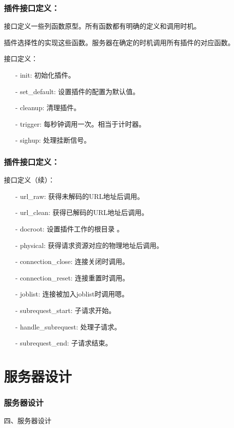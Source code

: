\documentclass[10pt,dvipdfm]{beamer}
\begin{document}
\begin{frame}
	\frametitle{插件接口定义：}
	接口定义一些列函数原型。所有函数都有明确的定义和调用时机。
	
	插件选择性的实现这些函数。服务器在确定的时机调用所有插件的对应函数。
	
	\pause
	
	\begin{block}{接口定义：}
	\begin{itemize}
		\item[-] init: 初始化插件。
		\item[-] set\_default: 设置插件的配置为默认值。
		\item[-] cleanup: 清理插件。
		\item[-] trigger: 每秒钟调用一次。相当于计时器。
		\item[-] sighup: 处理挂断信号。
	\end{itemize}
	\end{block}
\end{frame}

\begin{frame}
	\frametitle{插件接口定义：}
	\begin{block}{接口定义（续）：}
	\begin{itemize}
		\item[-] url\_raw: 获得未解码的URL地址后调用。
		\item[-] url\_clean: 获得已解码的URL地址后调用。
		\item[-] docroot: 设置插件工作的根目录 。
		\item[-] physical: 获得请求资源对应的物理地址后调用。
		\item[-] connection\_close: 连接关闭时调用。
		\item[-] connection\_reset: 连接重置时调用。
		\item[-] joblist: 连接被加入joblist时调用嗯。
		\item[-] subrequest\_start: 子请求开始。
		\item[-] handle\_subrequest: 处理子请求。
		\item[-] subrequest\_end: 子请求结束。
	\end{itemize}
	\end{block}
\end{frame}

\section{服务器设计}

\begin{frame}
	\frametitle{服务器设计}
	\begin{center}
	{\Large
		四、服务器设计
	}
	\end{center}
\end{frame}
\end{document}
